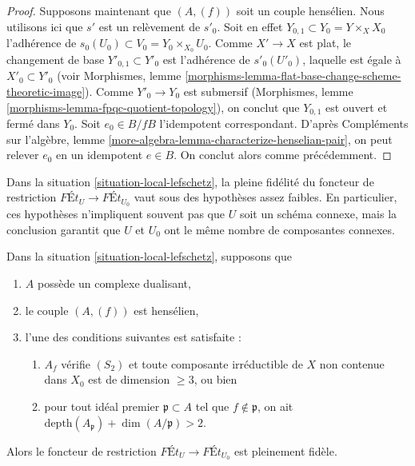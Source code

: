 \begin{proof}
\medskip\noindent
Supposons maintenant que $(A, (f))$ soit un couple hensélien. Nous utilisons ici que $s'$ est
un relèvement de $s'_0$. Soit en effet $Y_{0, 1} \subset Y_0 = Y \times_X X_0$
l'adhérence de $s_0(U_0) \subset V_0 = Y_0 \times_{X_0} U_0$.
Comme $X' \to X$ est plat, le changement de base $Y'_{0, 1} \subset Y'_0$
est l'adhérence de $s'_0(U'_0)$, laquelle est égale à $X'_0 \subset Y'_0$
(voir Morphismes, lemme
\ref{morphisms-lemma-flat-base-change-scheme-theoretic-image}).
Comme $Y'_0 \to Y_0$ est submersif
(Morphismes, lemme \ref{morphisms-lemma-fpqc-quotient-topology}),
on conclut que $Y_{0, 1}$ est ouvert et fermé dans $Y_0$.
Soit $e_0 \in B/fB$ l'idempotent correspondant.
D'après Compléments sur l'algèbre, lemme
\ref{more-algebra-lemma-characterize-henselian-pair},
on peut relever $e_0$ en un idempotent $e \in B$.
On conclut alors comme précédemment.
\end{proof}

\noindent
Dans la situation \ref{situation-local-lefschetz},
la pleine fidélité du foncteur de restriction
$\textit{F\'Et}_U \longrightarrow \textit{F\'Et}_{U_0}$
vaut sous des hypothèses assez faibles.
En particulier, ces hypothèses n'impliquent souvent pas que
$U$ soit un schéma connexe, mais la conclusion garantit
que $U$ et $U_0$ ont le même nombre de composantes connexes.

\begin{lemma}
\label{lemma-fully-faithful-simple}
Dans la situation \ref{situation-local-lefschetz}, supposons que
\begin{enumerate}
\item[(a)] $A$ possède un complexe dualisant,
\item[(b)] le couple $(A, (f))$ est hensélien,
\item[(c)] l'une des conditions suivantes est satisfaite :
\begin{enumerate}
\item[(i)] $A_f$ vérifie $(S_2)$ et toute composante irréductible de $X$
non contenue dans $X_0$ est de dimension $\geq 3$, ou bien
\item[(ii)] pour tout idéal premier
$\mathfrak p \subset A$ tel que $f \not \in \mathfrak p$, on ait
$\text{depth}(A_\mathfrak p) + \dim(A/\mathfrak p) > 2$.
\end{enumerate}
\end{enumerate}
Alors le foncteur de restriction
$\textit{F\'Et}_U \longrightarrow \textit{F\'Et}_{U_0}$
est pleinement fidèle.
\end{lemma}

